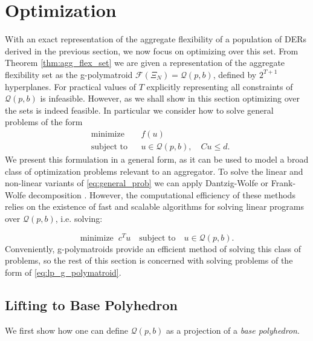 \section{Optimization}\label{sec:optimization}
With an exact representation of the aggregate flexibility of a population of DERs derived in the previous section, we now focus on optimizing over this set. From Theorem \ref{thm:agg_flex_set} we are given a representation of the aggregate flexibility set as the g-polymatroid $\mathcal{F}(\Xi_N) = \mathcal{Q}(p, b)$, defined by $2^{T+1}$ hyperplanes. For practical values of $T$ explicitly representing all constraints of $\mathcal{Q}(p, b)$ is infeasible. However, as we shall show in this section optimizing over the sets is indeed feasible.
In particular we consider how to solve general problems of the form
\begin{equation}\label{eq:general_prob}
    \begin{aligned}
        & \underset{}{\text{minimize}}
        & & f(u) \\
        & \text{subject to}
        & & u \in \mathcal{Q}(p,b),  \quad 
        Cu \leq d.
    \end{aligned}
\end{equation}
We present this formulation in a general form, as it can be used to model a broad class of optimization problems relevant to an aggregator. To solve the linear and non-linear variants of \eqref{eq:general_prob} we can apply Dantzig-Wolfe or Frank-Wolfe decomposition \cite{Dantzig1960DecompositionPrograms} \cite{Frank1956AnProgramming}. However, the computational efficiency of these methods relies on the existence of fast and scalable algorithms for solving linear programs over $\mathcal{Q}(p,b)$, i.e. solving:

\begin{equation}\label{eq:lp_g_polymatroid}
    \underset{}{\text{minimize}} \;\;  c^Tu \quad
    \text{subject to} \quad u \in \mathcal{Q}(p,b). 
\end{equation}
Conveniently, g-polymatroids provide an efficient method of solving this class of problems, so the rest of this section is concerned with solving problems of the form of \eqref{eq:lp_g_polymatroid}.

\subsection{Lifting to Base Polyhedron}
We first show how one can define $\mathcal{Q}(p,b)$ as a projection of a \textit{base polyhedron}. 

